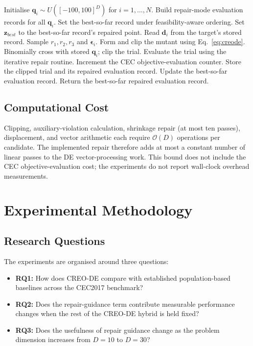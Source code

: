 \documentclass[journal]{IEEEtran}
\begin{document}
\begin{algorithm}[t]
\caption{CREO-DE as implemented in the CEC2017 scripts}
\label{alg:creode}
\begin{algorithmic}[1]
\STATE Initialise $\mathbf{q}_i\sim U([-100,100]^D)$ for $i=1,\ldots,N$.
\STATE Build repair-mode evaluation records for all $\mathbf{q}_i$.
\STATE Set the best-so-far record under feasibility-aware ordering.
  \STATE Set $\mathbf{z}_{best}$ to the best-so-far record's repaired point.
    \STATE Read $\mathbf{d}_i$ from the target's stored record.
    \STATE Sample $r_1,r_2,r_3$ and $\boldsymbol{\epsilon}_i$.
    \STATE Form and clip the mutant using Eq.~\eqref{eq:creode}.
    \STATE Binomially cross with stored $\mathbf{q}_i$; clip the trial.
    \STATE Evaluate the trial using the iterative repair routine.
    \STATE Increment the CEC objective-evaluation counter.
      \STATE Store the clipped trial and its repaired evaluation record.
    \ENDIF
  \ENDFOR
  \STATE Update the best-so-far evaluation record.
\ENDWHILE
\STATE Return the best-so-far repaired evaluation record.
\end{algorithmic}
\end{algorithm}

\subsection{Computational Cost}

Clipping, auxiliary-violation calculation, shrinkage repair (at most ten passes), displacement, and vector arithmetic each require $\mathcal{O}(D)$ operations per candidate. The implemented repair therefore adds at most a constant number of linear passes to the DE vector-processing work. This bound does not include the CEC objective-evaluation cost; the experiments do not report wall-clock overhead measurements.

\section{Experimental Methodology}

\subsection{Research Questions}

The experiments are organised around three questions:
\begin{itemize}
    \item \textbf{RQ1:} How does CREO-DE compare with established population-based baselines across the CEC2017 benchmark?
    \item \textbf{RQ2:} Does the repair-guidance term contribute measurable performance changes when the rest of the CREO-DE hybrid is held fixed?
    \item \textbf{RQ3:} Does the usefulness of repair guidance change as the problem dimension increases from $D=10$ to $D=30$?
\end{itemize}
\end{document}
